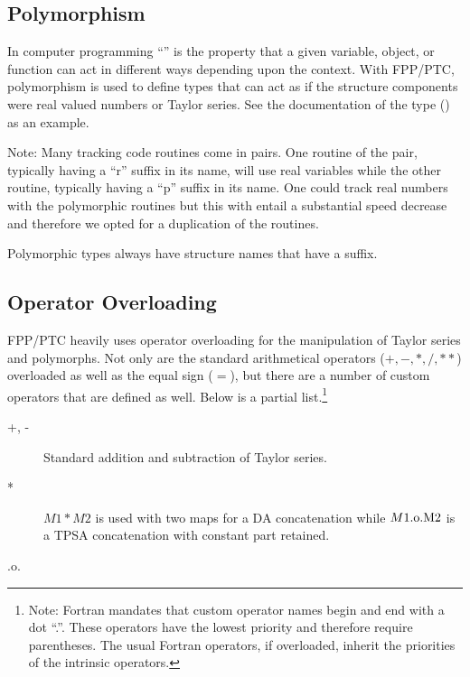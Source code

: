 \documentclass{hitec}     %
\begin{document}
{{{%
\subsection{Polymorphism}
\label{s:poly}

In computer programming ``'' is the property that a given variable, object, or
function can act in different ways depending upon the context. With FPP/PTC, polymorphism is used to
define types that can act as if the structure components were real valued numbers or Taylor series.
See the documentation of the  type () as an example.

Note: Many  tracking code routines come in pairs. One routine of the pair, typically having a 
``r'' suffix in its name, will use real variables while the other routine, typically having a ``p'' suffix 
in its name. {\color{h} One could track real numbers with the polymorphic routines but this with entail a substantial speed decrease and therefore we opted for a duplication of the routines.}

Polymorphic types always have structure names that have a 
suffix.

\subsection{Operator Overloading}
\label{s:overloading}

FPP/PTC heavily uses operator overloading for  the manipulation of Taylor series  and polymorphs. Not only are the standard
arithmetical operators ($+, -, *, /, **$) overloaded as well as the equal sign ($=$), but there are
a number of custom operators that are defined as well. Below is a partial list.\footnote
  {\color{h}
Note: Fortran mandates that custom operator names begin and end with a dot ``.''. These operators have the lowest priority and therefore require parentheses. The usual Fortran operators, if overloaded, inherit the priorities of the intrinsic operators. 
  }
\begin{description}
\item[+, -] \Newline
Standard addition and subtraction of Taylor series.
%
\item[*] \Newline
$M1 * M2$ is used with two maps for  {\color{h} a DA concatenation while  $M1 \rm{.o.} M2$ is a TPSA concatenation with constant part retained.}
%
\item[.o.] \Newline


\end{description}}}}
\end{document}
